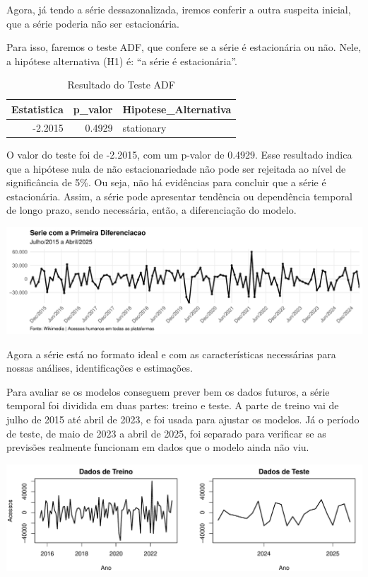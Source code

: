 \documentclass[
]{article}
\begin{document}
\newpage

Agora, já tendo a série dessazonalizada, iremos conferir a outra
suspeita inicial, que a série poderia não ser estacionária.

Para isso, faremos o teste ADF, que confere se a série é estacionária ou
não. Nele, a hipótese alternativa (H1) é: ``a série é estacionária''.

\begin{table}[!h]
\centering
\caption{\label{tab:tab:adf}Resultado do Teste ADF}
\centering
\begin{tabular}[t]{rrl}
\toprule
Estatistica & p\_valor & Hipotese\_Alternativa\\
\midrule
-2.2015 & 0.4929 & stationary\\
\bottomrule
\end{tabular}
\end{table}

O valor do teste foi de -2.2015, com um p-valor de 0.4929. Esse
resultado indica que a hipótese nula de não estacionariedade não pode
ser rejeitada ao nível de significância de 5\%. Ou seja, não há
evidências para concluir que a série é estacionária. Assim, a série pode
apresentar tendência ou dependência temporal de longo prazo, sendo
necessária, então, a diferenciação do modelo.

\includegraphics{analise-series-temporais-flamengo_files/figure-latex/unnamed-chunk-7-1.pdf}

Agora a série está no formato ideal e com as características necessárias
para nossas análises, identificações e estimações.

Para avaliar se os modelos conseguem prever bem os dados futuros, a
série temporal foi dividida em duas partes: treino e teste. A parte de
treino vai de julho de 2015 até abril de 2023, e foi usada para ajustar
os modelos. Já o período de teste, de maio de 2023 a abril de 2025, foi
separado para verificar se as previsões realmente funcionam em dados que
o modelo ainda não viu.

\includegraphics{analise-series-temporais-flamengo_files/figure-latex/unnamed-chunk-8-1.pdf}
\end{document}
